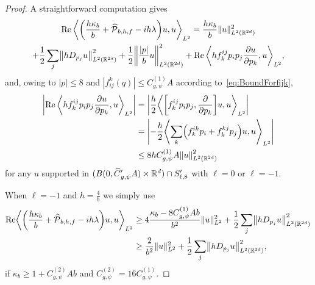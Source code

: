 \documentclass[AHL,Unicode,longabstracts]{cedram}
\newcommand{\R}{\mathbb{R}}
\newcommand{\clP}{\mathcal{P}}
\DeclareMathOperator{\Ree}{Re}
\newcommand\norm[1]{\left\lVert#1\right\rVert}
\let\oldhat\hat
\renewcommand*{\hat}[1]{\mathchoice{\widehat{#1}}{\widehat{#1}}{\oldhat{#1}}{\oldhat{#1}}}
\let\originalleft\left
\let\originalright\right
\renewcommand{\left}{\mathopen{}\mathclose\bgroup\originalleft}
\renewcommand{\right}{\aftergroup\egroup\originalright}
\begin{document}
\begin{proof}
A straightforward computation gives
\begin{multline}\label{eq:straightfor}
\Ree\, \left\langle \left(\frac{h\kappa_b}{b} + \hat{\clP}_{b,h,f}-i h\lambda \right) u, u \right\rangle_{L^2}
= \frac{h\kappa_b}{b} \|u\|_{L^2(\R^{2d})}^2 \\+ \frac{1}{2} \sum_j \left\| hD_{p_j} u \right\|_{L^2(\R^{2d})}^2
 + \frac{1}{2}\left\| \frac{|p|}{b} u \right\|_{L^2(\R^{2d})}^2 
+ \Ree\, \left\langle hf^{ij}_k p_ip_j \frac{\partial u} {\partial p_k},u \right\rangle_{L^2},
\end{multline}
and, owing to $|p|\leq 8$ and $|f_{ij}^{k}(q)|\leq C_{g,\psi}^{(1)}A$ according to~\eqref{eq:BoundForfijk},
\begin{equation}\label{equality:fErrorTerm}
\begin{aligned}[t]
\left|\Ree\, \left\langle hf^{ij}_k p_ip_j \frac{\partial u}{\partial p_k},u \right\rangle_{L^2}\right| &= \left|\frac{h}{2}
\left\langle
\left[f^{ij}_{k}p_{i}p_{j},\frac{\partial}{\partial p_{k}} \right]u, u \right\rangle_{L^2}\right|\\
&= \left|-\frac{h}{2}
\left\langle
\sum_k\left(f^{ik}_{k}p_{i}+f^{kj}_{k}p_{j}
\right)u, u
\right\rangle_{L^2}\right|
\\
&\leq 8h C_{g,\psi}^{(1)} A\norm{u}_{L^2(\R^{2d})}^2
\end{aligned}
\end{equation}
for any $u$ supported in $(B(0,\hat{C}'_{g,\psi}A)\times \R^d)\cap S_{\ell,8}'$ with $\ell=0$ or $\ell=-1$.

When $\ell=-1$ and $h=\frac{4}{b}$ we simply use
\begin{align*}
\Ree \left\langle \left(\frac{h\kappa_b}{b} + \hat{\clP}_{b,h,f}-i h\lambda \right) u, u \right\rangle_{L^2} &
\geq 4\frac{\kappa_b-8C_{g,\psi}^{(1)}Ab}{b^2} \|u\|_{L^2}^2 + \frac{1}{2} \sum_j \left\| hD_{p_j} u \right\|_{L^2(\R^{2d})}^2
\\
&\geq \frac{2}{b^2}\|u\|_{L^2}^2 + \frac{1}{2} \sum_j \left\| hD_{p_j} u \right\|_{L^2(\R^{2d})}^2,
\end{align*}
if $\kappa_b\geq 1+C_{g,\psi}^{(2)}Ab$ and $C_{g,\psi}^{(2)}=16C_{g,\psi}^{(1)}$.


\end{proof}
\end{document}
